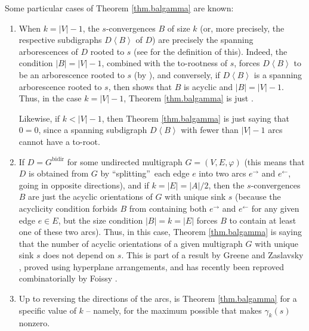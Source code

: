 \documentclass[numbers=enddot,12pt,final,onecolumn,notitlepage]{scrartcl}%
\theoremstyle{definition}
\theoremstyle{plainsl}
\begin{document}
Some particular cases of Theorem \ref{thm.balgamma} are known:

\begin{enumerate}
\item When $k=\left\vert V\right\vert -1$, the $s$-convergences $B$ of size
$k$ (or, more precisely, the respective subdigraphs $D\left\langle
B\right\rangle $ of $D$) are precisely the spanning arborescences of $D$
rooted to $s$ (see \cite[Definition 5.10.1 \textbf{(b)}]{22s} for the
definition of this). Indeed, the condition $\left\vert B\right\vert
=\left\vert V\right\vert -1$, combined with the to-rootness of $s$, forces
$D\left\langle B\right\rangle $ to be an arborescence rooted to $s$ (by
\cite[Theorem 5.10.5]{22s}), and conversely, if $D\left\langle B\right\rangle
$ is a spanning arborescence rooted to $s$, then \cite[Theorem 5.10.5]{22s}
shows that $B$ is acyclic and $\left\vert B\right\vert =\left\vert
V\right\vert -1$. Thus, in the case $k=\left\vert V\right\vert -1$, Theorem
\ref{thm.balgamma} is just \cite[Corollary 5.12.1]{22s}.

Likewise, if $k<\left\vert V\right\vert -1$, then Theorem \ref{thm.balgamma}
is just saying that $0=0$, since a spanning subdigraph $D\left\langle
B\right\rangle $ with fewer than $\left\vert V\right\vert -1$ arcs cannot have
a to-root.

\item If $D=G^{\operatorname*{bidir}}$ for some undirected multigraph
$G=\left(  V,E,\varphi\right)  $ (this means that $D$ is obtained from $G$ by
\textquotedblleft splitting\textquotedblright\ each edge $e$ into two arcs
$e^{\rightarrow}$ and $e^{\leftarrow}$, going in opposite directions), and if
$k=\left\vert E\right\vert =\left\vert A\right\vert /2$, then the
$s$-convergences $B$ are just the acyclic orientations of $G$ with unique sink
$s$ (because the acyclicity condition forbids $B$ from containing both
$e^{\rightarrow}$ and $e^{\leftarrow}$ for any given edge $e\in E$, but the
size condition $\left\vert B\right\vert =k=\left\vert E\right\vert $ forces
$B$ to contain at least one of these two arcs). Thus, in this case, Theorem
\ref{thm.balgamma} is saying that the number of acyclic orientations of a
given multigraph $G$ with unique sink $s$ does not depend on $s$. This is part
of a result by Greene and Zaslavsky \cite[Theorem 7.3]{GreZas83}, proved using
hyperplane arrangements, and has recently been reproved combinatorially by
Foissy \cite[Proposition 4.6]{Foissy22}.

\item Up to reversing the directions of the arcs, \cite[Proposition
3.7]{PerPha15} is Theorem \ref{thm.balgamma} for a specific value of $k$ --
namely, for the maximum possible that makes $\gamma_{k}\left(  s\right)  $ nonzero.


\end{enumerate}
\end{document}
